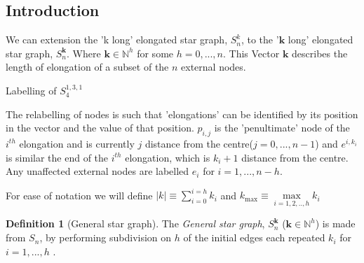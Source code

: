 \documentclass[a4paper,10pt]{article}
\theoremstyle{definition}
\newtheorem{definition}[theorem]{Definition}
\theoremstyle{definition}
\theoremstyle{remark}
\theoremstyle{definition}
\begin{document}
\subsection{Introduction}
We can extension the 'k long' elongated star graph, $S_{n}^k$, to the '$\bm{k}$ long' elongated star graph, $S^{\bm{k}}_{n}$. Where $\bm{k} \in \mathbb{N}^{h}$ for some $h=0,...,n$. This Vector $\bm{k}$ describes the length of elongation of a subset of the $n$ external nodes.

\begin{myfigure}
\begin{center}
\end{center}
\caption{Labelling of $S^{1,3,1}_{4}$}
\end{myfigure}

The relabelling of nodes is such that 'elongations' can be identified by its position in the vector and the value of that position. $p_{i,j}$ is the 'penultimate' node of the $i^{th}$ elongation and is currently $j$ distance from the centre($j=0,...,n-1$) and $e^{i,k_{i}}$ is similar the end of the $i^{th}$ elongation, which is $k_{i}+1$ distance from the centre. Any unaffected external nodes are labelled $e_{i}$ for $i=1,...,n-h$.

For ease of notation we will define $ |k| \equiv \sum\limits_{i=0}^{i=h} k_{i}$ and $ k_{\max} \equiv \max\limits_{i=1,2,..,h} k_{i}$

\begin{definition}[General star graph]
The \textit{General star graph}, $S^{\bm{k}}_{n}$ ($\bm{k} \in \mathbb{N}^{h}$) is made from $S_{n}$, by performing subdivision on $h$ of the  initial edges each repeated $k_{i}$ for $i=1,...,h$ . 
\end{definition}
\end{document}
